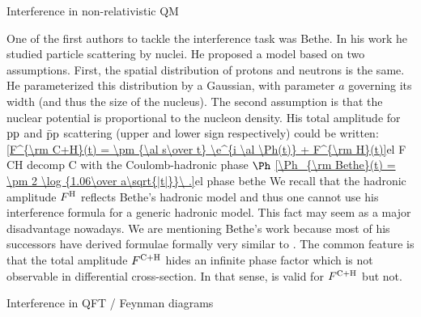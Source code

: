 \caption{Interference in non-relativistic QM}

One of the first authors to tackle the interference task was Bethe. In his work  he studied particle scattering by nuclei. He proposed a model based on two assumptions. First, the spatial distribution of protons and neutrons is the same. He parameterized this distribution by a Gaussian, with parameter $a$ governing its width (and thus the size of the nucleus). The second assumption is that the nuclear potential is proportional to the nucleon density. His total amplitude for $\rm pp$ and $\rm \bar pp$ scattering (upper and lower sign respectively) could be written:
\eqref{F^{\rm C+H}(t) = \pm {\al s\over t} \e^{i \al \Ph(t)} + F^{\rm H}(t)}{el F CH decomp C}
with the Coulomb-hadronic phase $\Ph$
\eqref{\Ph_{\rm Bethe}(t) = \pm 2 \log {1.06\over a\sqrt{|t|}}\ .}{el phase bethe}
We recall that the hadronic amplitude $F^{\rm H}$ reflects Bethe's hadronic model and thus one cannot use his interference formula for a generic hadronic model. This fact may seem as a major disadvantage nowadays. We are mentioning Bethe's work because most of his successors have derived formulae formally very similar to . The common feature is that the total amplitude $F^{\rm C+H}$ hides an infinite phase factor which is not observable in differential cross-section. In that sense,  is valid for $F^{\rm C+H}$ but  not.

\caption{Interference in QFT / Feynman diagrams}



